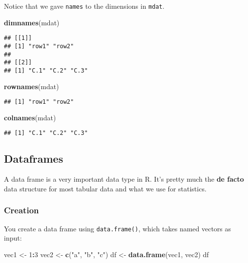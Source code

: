 \documentclass[
]{book}
\newenvironment{Shaded}{\begin{snugshade}}{\end{snugshade}}
\newcommand{\DecValTok}[1]{\textcolor[rgb]{0.00,0.00,0.81}{#1}}
\newcommand{\KeywordTok}[1]{\textcolor[rgb]{0.13,0.29,0.53}{\textbf{#1}}}
\newcommand{\NormalTok}[1]{#1}
\newcommand{\OperatorTok}[1]{\textcolor[rgb]{0.81,0.36,0.00}{\textbf{#1}}}
\newcommand{\StringTok}[1]{\textcolor[rgb]{0.31,0.60,0.02}{#1}}
\begin{document}
Notice that we gave \texttt{names} to the dimensions in \texttt{mdat}.

\begin{Shaded}
\begin{Highlighting}[]
\KeywordTok{dimnames}\NormalTok{(mdat)}
\end{Highlighting}
\end{Shaded}

\begin{verbatim}
## [[1]]
## [1] "row1" "row2"
## 
## [[2]]
## [1] "C.1" "C.2" "C.3"
\end{verbatim}

\begin{Shaded}
\begin{Highlighting}[]
\KeywordTok{rownames}\NormalTok{(mdat)}
\end{Highlighting}
\end{Shaded}

\begin{verbatim}
## [1] "row1" "row2"
\end{verbatim}

\begin{Shaded}
\begin{Highlighting}[]
\KeywordTok{colnames}\NormalTok{(mdat)}
\end{Highlighting}
\end{Shaded}

\begin{verbatim}
## [1] "C.1" "C.2" "C.3"
\end{verbatim}

\hypertarget{dataframes}{%
\subsection{Dataframes}\label{dataframes}}

A data frame is a very important data type in R. It's pretty much the \textbf{de facto} data structure for most tabular data and what we use for statistics.

\hypertarget{creation}{%
\subsubsection{Creation}\label{creation}}

You create a data frame using \texttt{data.frame()}, which takes named vectors as input:

\begin{Shaded}
\begin{Highlighting}[]
\NormalTok{vec1 \textless{}{-}}\StringTok{ }\DecValTok{1}\OperatorTok{:}\DecValTok{3}
\NormalTok{vec2 \textless{}{-}}\StringTok{ }\KeywordTok{c}\NormalTok{(}\StringTok{"a"}\NormalTok{, }\StringTok{"b"}\NormalTok{, }\StringTok{"c"}\NormalTok{)}
\NormalTok{df \textless{}{-}}\StringTok{ }\KeywordTok{data.frame}\NormalTok{(vec1, vec2)}
\NormalTok{df}
\end{Highlighting}
\end{Shaded}
\end{document}
